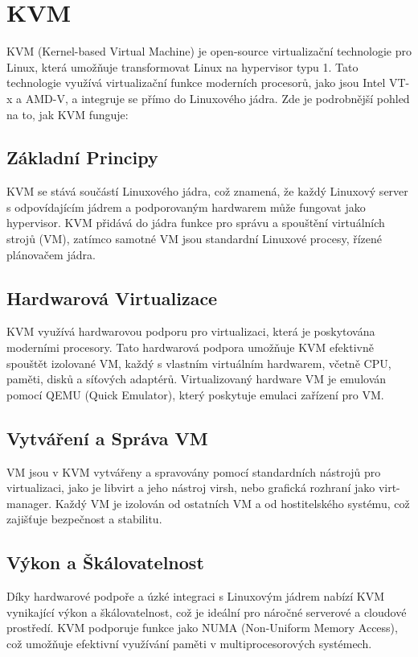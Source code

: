 \section{KVM}
KVM (Kernel-based Virtual Machine) je open-source virtualizační technologie pro Linux, která umožňuje transformovat Linux na hypervisor typu 1. Tato technologie využívá virtualizační funkce moderních procesorů, jako jsou Intel VT-x a AMD-V, a integruje se přímo do Linuxového jádra. Zde je podrobnější pohled na to, jak KVM funguje:

\subsection{Základní Principy}
KVM se stává součástí Linuxového jádra, což znamená, že každý Linuxový server s odpovídajícím jádrem a podporovaným hardwarem může fungovat jako hypervisor.
KVM přidává do jádra funkce pro správu a spouštění virtuálních strojů (VM), zatímco samotné VM jsou standardní Linuxové procesy, řízené plánovačem jádra.

\subsection{Hardwarová Virtualizace}
KVM využívá hardwarovou podporu pro virtualizaci, která je poskytována moderními procesory. Tato hardwarová podpora umožňuje KVM efektivně spouštět izolované VM, každý s vlastním virtuálním hardwarem, včetně CPU, paměti, disků a síťových adaptérů.
Virtualizovaný hardware VM je emulován pomocí QEMU (Quick Emulator), který poskytuje emulaci zařízení pro VM.

\subsection{Vytváření a Správa VM}
VM jsou v KVM vytvářeny a spravovány pomocí standardních nástrojů pro virtualizaci, jako je libvirt a jeho nástroj virsh, nebo grafická rozhraní jako virt-manager.
Každý VM je izolován od ostatních VM a od hostitelského systému, což zajišťuje bezpečnost a stabilitu.

\subsection{Výkon a Škálovatelnost}
Díky hardwarové podpoře a úzké integraci s Linuxovým jádrem nabízí KVM vynikající výkon a škálovatelnost, což je ideální pro náročné serverové a cloudové prostředí.
KVM podporuje funkce jako NUMA (Non-Uniform Memory Access), což umožňuje efektivní využívání paměti v multiprocesorových systémech.


